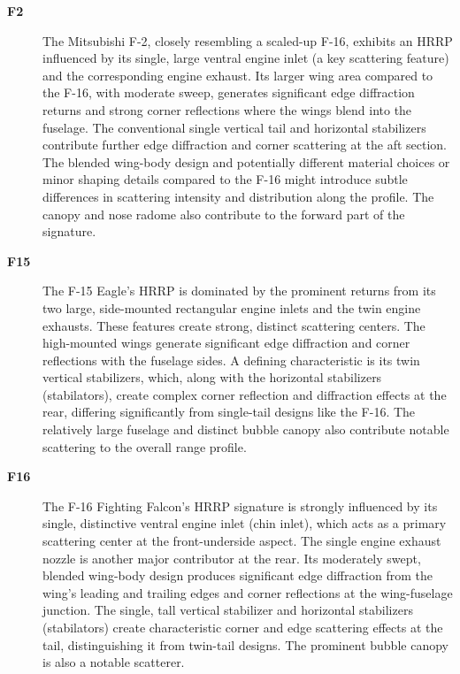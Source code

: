 {\begin{description}
    \item[\textbf{F2}]
    The Mitsubishi F-2, closely resembling a scaled-up F-16, exhibits an HRRP influenced by its single, large ventral engine inlet (a key scattering feature) and the corresponding engine exhaust. Its larger wing area compared to the F-16, with moderate sweep, generates significant edge diffraction returns and strong corner reflections where the wings blend into the fuselage. The conventional single vertical tail and horizontal stabilizers contribute further edge diffraction and corner scattering at the aft section. The blended wing-body design and potentially different material choices or minor shaping details compared to the F-16 might introduce subtle differences in scattering intensity and distribution along the profile. The canopy and nose radome also contribute to the forward part of the signature.

    \item[\textbf{F15}]
    The F-15 Eagle's HRRP is dominated by the prominent returns from its two large, side-mounted rectangular engine inlets and the twin engine exhausts. These features create strong, distinct scattering centers. The high-mounted wings generate significant edge diffraction and corner reflections with the fuselage sides. A defining characteristic is its twin vertical stabilizers, which, along with the horizontal stabilizers (stabilators), create complex corner reflection and diffraction effects at the rear, differing significantly from single-tail designs like the F-16. The relatively large fuselage and distinct bubble canopy also contribute notable scattering to the overall range profile.

    \item[\textbf{F16}]
    The F-16 Fighting Falcon's HRRP signature is strongly influenced by its single, distinctive ventral engine inlet (chin inlet), which acts as a primary scattering center at the front-underside aspect. The single engine exhaust nozzle is another major contributor at the rear. Its moderately swept, blended wing-body design produces significant edge diffraction from the wing's leading and trailing edges and corner reflections at the wing-fuselage junction. The single, tall vertical stabilizer and horizontal stabilizers (stabilators) create characteristic corner and edge scattering effects at the tail, distinguishing it from twin-tail designs. The prominent bubble canopy is also a notable scatterer.


\end{description}}
